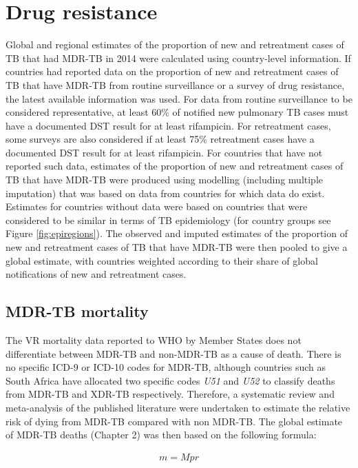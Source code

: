 \section{Drug resistance}

Global and regional estimates of the proportion of new and retreatment cases of TB that had MDR-TB in 2014 were calculated using country-level information. If countries had reported data on the proportion of new and retreatment cases of TB that have MDR-TB from routine surveillance or a survey of drug resistance, the latest available information was used. For data from routine surveillance to be considered representative, at least 60\% of notified new pulmonary TB cases must have a documented DST result for at least rifampicin. For retreatment cases, some surveys are also considered if at least 75\% retreatment cases have a documented DST result for at least rifampicin. For countries that have not reported such data, estimates of the proportion of new and retreatment cases of TB that have MDR-TB were produced using modelling (including multiple imputation) that was based on data from countries for which data do exist. Estimates for countries without data were based on countries that were considered to be similar in terms of TB epidemiology (for country groups see Figure \ref{fig:epiregions}). The observed and imputed estimates of the proportion of new and retreatment cases of TB that have MDR-TB were then pooled to give a global estimate, with countries weighted according to their share of global notifications of new and retreatment cases.

\subsection{MDR-TB mortality}

The VR mortality data reported to WHO by Member States does not differentiate between MDR-TB and non-MDR-TB as a cause of death. There is no specific ICD-9 or ICD-10 codes for MDR-TB, although countries such as South Africa have allocated two specific codes \textit{U51} and \textit{U52} to classify deaths from MDR-TB and XDR-TB respectively. Therefore, a systematic review and meta-analysis of the published literature were undertaken to estimate the relative risk of dying from MDR-TB compared with non MDR-TB. The global estimate of MDR-TB deaths (Chapter 2) was then based on the following formula: 

\begin{align*}
m = Mpr
\end{align*}

